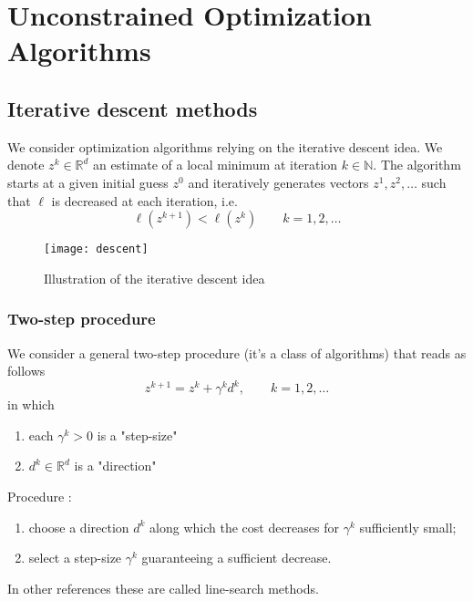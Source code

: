 \documentclass[openany]{book}
\newcommand{\R}{\mathbb{R}}               %
\newcommand{\N}{\mathbb{N}}               %
\theoremstyle{definition}
\theoremstyle{remark}
\begin{document}
\section{Unconstrained Optimization Algorithms}
\subsection{Iterative descent methods}
We consider optimization algorithms relying on the iterative descent idea. We denote $z^k\in\R^d$ an estimate of a local minimum at iteration $k\in\N$. The algorithm starts at a given initial guess $z^0$ and iteratively generates vectors $z^1,z^2,\dots$ such that $\ell$ is decreased at each iteration, i.e. 
\[
    \ell(z^{k+1})<\ell(z^k) \qquad k = 1,2,\dots
\]
\begin{figure}[ht]
    \centering
    \texttt{[image: descent]}
    \caption{Illustration of the iterative descent idea}
\end{figure}
\subsubsection{Two-step procedure}
We consider a general two-step procedure (it's a class of algorithms) that reads as follows 
\[
    z^{k+1} = z^k+\gamma^k d^k, \qquad k=1,2,\dots
\]
in which 
\begin{enumerate}
    \item each $\gamma^k>0$ is a "step-size" 
    \item $d^k\in\R^d$ is a "direction"
\end{enumerate}
Procedure : 
\begin{enumerate}
    \item choose a direction $d^k$ along which the cost decreases for $\gamma^k$ sufficiently small;
    \item select a step-size $\gamma^k$ guaranteeing a sufficient decrease. 
\end{enumerate}
In other references these are called line-search methods.
\end{document}
